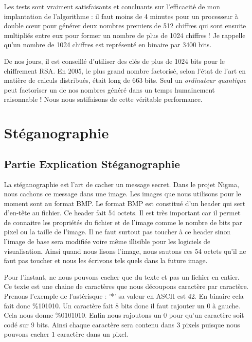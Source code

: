 \documentclass[a4paper,12pt]{article}
\begin{document}
Les tests sont vraiment satisfaisants et concluants sur l'efficacité de mon implantation de l'algorithme : il faut moins de 4 minutes pour un processeur à double c\oe{}ur pour générer deux nombres premiers de 512 chiffres qui sont ensuite multipliés entre eux pour former un nombre de plus de 1024 chiffres ! Je rappelle qu'un nombre de 1024 chiffres est représenté en binaire par 3400 bits.

De nos jours, il est conseillé d'utiliser des clés de plus de 1024 bits pour le chiffrement RSA. En 2005, le plus grand nombre factorisé, selon l'état de l'art en matière de calculs distribués, était long de 663 bits. Seul un \emph{ordinateur quantique} peut factoriser un de nos nombres généré dans un temps humainement raisonnable ! Nous nous satifaisons de cette véritable performance.

\newpage

\section{Stéganographie}

\subsection{Partie Explication Stéganographie}

La stéganographie est l'art de cacher un message secret. Dans le projet Nigma, nous cachons ce message dans une image. Les images que nous utilisons pour le moment sont au format BMP. Le format BMP est constitué d'un header qui sert d'en-tête au fichier. Ce header fait 54 octets. Il est très important car il permet de connaitre les propriétés du fichier et de l'image comme le nombre de bits par pixel ou la taille de l'image. Il ne faut surtout pas toucher à ce header sinon l'image de base sera modifiée voire même illisible pour les logiciels de visualisation. Ainsi quand nous lisons l'image, nous sautons ces 54 octets qu'il ne faut pas toucher et nous les écrivons tels quels dans la future image.

Pour l'instant, ne nous pouvons cacher que du texte et pas un fichier en entier. Ce texte est une chaine de caractères que nous découpons caractère par caractère. Prenons l'exemple de l'astérisque : '*' sa valeur en ASCII est 42. En binaire cela fait donc \%101010. Un caractère fait 8 bits donc il faut rajouter un 0 à gauche. Cela nous donne \%0101010. Enfin nous rajoutons un 0 pour qu’un caractère soit codé sur 9 bits. Ainsi chaque caractère sera contenu dans 3 pixels puisque nous pouvons cacher 1 caractère dans un pixel.
\end{document}
